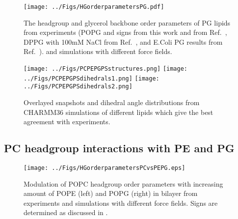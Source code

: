 \documentclass[aps,prl,superscriptaddress,twocolumn]{revtex4}
\begin{document}
\begin{figure}[!h]
  \centering
  \texttt{[image: ../Figs/HGorderparametersPG.pdf]}
  \caption{\label{HGorderParametersPOPG}
    The headgroup and glycerol backbone order parameters of PG lipids
    from experiments (POPG and signs from this work and from Ref.~, %
    DPPG with 100mM NaCl from Ref.~,%
    and E.Coli PG results from Ref.~).
    and simulations with different force fields.
  }
\end{figure}
\begin{figure*}[!h]
  \centering
  \texttt{[image: ../Figs/PCPEPGPSstructures.png]}
  \texttt{[image: ../Figs/PCPEPGPSdihedrals1.png]}
  \texttt{[image: ../Figs/PCPEPGPSdihedrals2.png]}
  \caption{\label{structures}
    Overlayed snapshots and dihedral angle distributions from CHARMM36 simulations of different lipids which give the best agreement with experiments.
  }
\end{figure*}

\clearpage
\subsection{PC headgroup interactions with PE and PG}
\begin{figure*}[]
  \centering
  \texttt{[image: ../Figs/HGorderparametersPCvsPEPG.eps]}
  \caption{\label{HGorderparametersPCvsPEPG}
    Modulation of POPC headgroup order parameters with increasing amount of POPE (left) and POPG (right) in bilayer
    from experiments \cite{scherer87,macdonald87} and simulations with different force fields.
    Signs are determined as discussed in \cite{botan15,ollila16}.
  }
\end{figure*}
\end{document}
